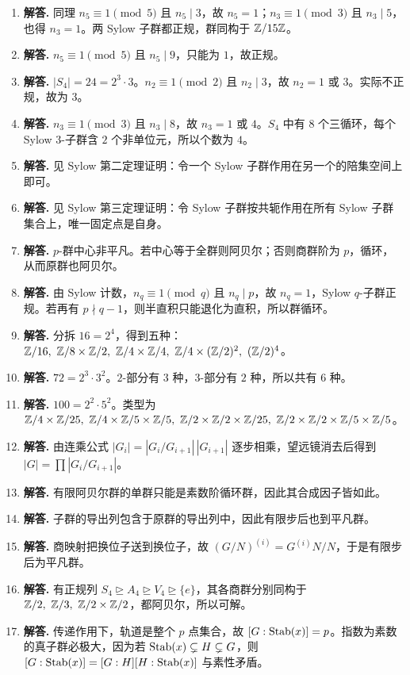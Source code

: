 \begin{enumerate}[label=\textbf{\arabic*.}, leftmargin=*, itemsep=1em]
\item \textbf{解答.} 同理 $n_5\equiv1\pmod5$ 且 $n_5\mid3$，故 $n_5=1$；$n_3\equiv1\pmod3$ 且 $n_3\mid5$，也得 $n_3=1$。两 Sylow 子群都正规，群同构于 $\mathbb{Z}/15\mathbb{Z}$。
\item \textbf{解答.} $n_5\equiv1\pmod5$ 且 $n_5\mid9$，只能为 $1$，故正规。
\item \textbf{解答.} $|S_4|=24=2^3\cdot3$。$n_2\equiv1\pmod2$ 且 $n_2\mid3$，故 $n_2=1$ 或 $3$。实际不正规，故为 $3$。
\item \textbf{解答.} $n_3\equiv1\pmod3$ 且 $n_3\mid8$，故 $n_3=1$ 或 $4$。$S_4$ 中有 $8$ 个三循环，每个 Sylow $3$-子群含 $2$ 个非单位元，所以个数为 $4$。
\item \textbf{解答.} 见 Sylow 第二定理证明：令一个 Sylow 子群作用在另一个的陪集空间上即可。
\item \textbf{解答.} 见 Sylow 第三定理证明：令 Sylow 子群按共轭作用在所有 Sylow 子群集合上，唯一固定点是自身。
\item \textbf{解答.} $p$-群中心非平凡。若中心等于全群则阿贝尔；否则商群阶为 $p$，循环，从而原群也阿贝尔。
\item \textbf{解答.} 由 Sylow 计数，$n_q\equiv1\pmod q$ 且 $n_q\mid p$，故 $n_q=1$，Sylow $q$-子群正规。若再有 $p\nmid q-1$，则半直积只能退化为直积，所以群循环。
\item \textbf{解答.} 分拆 $16=2^4$，得到五种：$\Z/16,\ \Z/8\times\Z/2,\ \Z/4\times\Z/4,\ \Z/4\times(\Z/2)^2,\ (\Z/2)^4$。
\item \textbf{解答.} $72=2^3\cdot3^2$。$2$-部分有 $3$ 种，$3$-部分有 $2$ 种，所以共有 $6$ 种。
\item \textbf{解答.} $100=2^2\cdot5^2$。类型为 $\Z/4\times\Z/25,\ \Z/4\times\Z/5\times\Z/5,\ \Z/2\times\Z/2\times\Z/25,\ \Z/2\times\Z/2\times\Z/5\times\Z/5$。
\item \textbf{解答.} 由连乘公式 $|G_i|=|G_i/G_{i+1}|\,|G_{i+1}|$ 逐步相乘，望远镜消去后得到 $|G|=\prod |G_i/G_{i+1}|$。
\item \textbf{解答.} 有限阿贝尔群的单群只能是素数阶循环群，因此其合成因子皆如此。
\item \textbf{解答.} 子群的导出列包含于原群的导出列中，因此有限步后也到平凡群。
\item \textbf{解答.} 商映射把换位子送到换位子，故 $(G/N)^{(i)}=G^{(i)}N/N$，于是有限步后为平凡群。
\item \textbf{解答.} 有正规列 $S_4\trianglerighteq A_4\trianglerighteq V_4\trianglerighteq\{e\}$，其各商群分别同构于 $\Z/2,\ \Z/3,\ \Z/2\times\Z/2$，都阿贝尔，所以可解。
\item \textbf{解答.} 传递作用下，轨道是整个 $p$ 点集合，故 $[G:\operatorname{Stab}(x)]=p$。指数为素数的真子群必极大，因为若 $\operatorname{Stab}(x)\subsetneq H\subsetneq G$，则 $[G:\operatorname{Stab}(x)]=[G:H][H:\operatorname{Stab}(x)]$ 与素性矛盾。

\end{enumerate}
